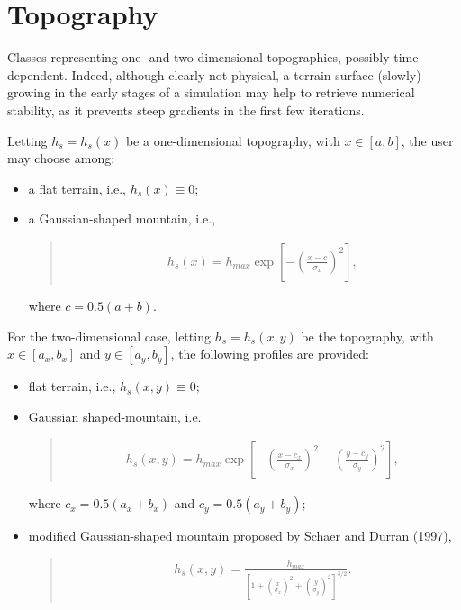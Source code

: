 \documentclass[letterpaper,10pt,english]{sphinxmanual}
\begin{document}
\section{Topography}
\label{\detokenize{api:module-grids.topography}}\label{\detokenize{api:topography}}
Classes representing one- and two-dimensional topographies, possibly time-dependent.
Indeed, although clearly not physical, a terrain surface (slowly) growing in the early stages
of a simulation may help to retrieve numerical stability, as it prevents steep gradients
in the first few iterations.

Letting \(h_s = h_s(x)\) be a one-dimensional topography, with \(x \in [a,b]\),
the user may choose among:
\begin{itemize}
\item {} 
a flat terrain, i.e., \(h_s(x) \equiv 0\);

\item {} 
a Gaussian-shaped mountain, i.e.,
\begin{quote}
\begin{equation*}
\begin{split}h_s(x) = h_{max} \exp{\left[ - \left( \frac{x - c}{\sigma_x} \right)^2 \right]},\end{split}
\end{equation*}\end{quote}

where \(c = 0.5 (a + b)\).

\end{itemize}

For the two-dimensional case, letting \(h_s = h_s(x,y)\) be the topography, with
\(x \in [a_x,b_x]\) and \(y \in [a_y,b_y]\), the following profiles are provided:
\begin{itemize}
\item {} 
flat terrain, i.e., \(h_s(x,y) \equiv 0\);

\item {} 
Gaussian shaped-mountain, i.e.
\begin{quote}
\begin{equation*}
\begin{split}h_s(x,y) = h_{max} \exp{\left[ - \left( \frac{x - c_x}{\sigma_x} \right)^2 - \left( \frac{y - c_y}{\sigma_y} \right)^2 \right]} ,\end{split}
\end{equation*}\end{quote}

where \(c_x = 0.5 (a_x + b_x)\) and \(c_y = 0.5 (a_y + b_y)\);

\item {} 
modified Gaussian-shaped mountain proposed by Schaer and Durran (1997),
\begin{quote}
\begin{equation*}
\begin{split}h_s(x,y) = \frac{h_{max}}{\left[ 1 + \left( \frac{x}{\sigma_x} \right)^2 + \left( \frac{y}{\sigma_y} \right)^2 \right]^{3/2}}.\end{split}
\end{equation*}\end{quote}

\end{itemize}
\end{document}
